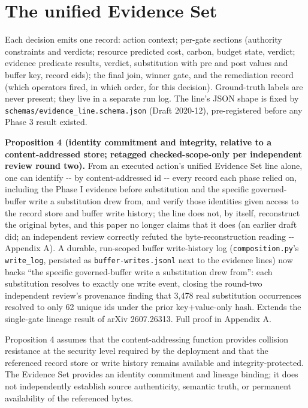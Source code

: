\documentclass[11pt,a4paper]{article}
\theoremstyle{definition}
\begin{document}
\section{The unified Evidence Set}

Each decision emits one record: action context; per-gate sections (authority constraints and verdicts; resource predicted cost, carbon, budget state, verdict; evidence predicate results, verdict, substitution with pre and post values and buffer key, record eids); the final join, winner gate, and the remediation record (which operators fired, in which order, for this decision). Ground-truth labels are never present; they live in a separate run log. The line's JSON shape is fixed by \texttt{schemas/evidence\_line.schema.json} (Draft 2020-12), pre-registered before any Phase 3 result existed.

\noindent\textbf{Proposition 4 (identity commitment and integrity, relative to a content-addressed store; retagged checked-scope-only per independent review round two).} From an executed action's unified Evidence Set line alone, one can identify -{}- by content-addressed id -{}- every record each phase relied on, including the Phase I evidence before substitution and the specific governed-buffer write a substitution drew from, and verify those identities given access to the record store and buffer write history; the line does not, by itself, reconstruct the original bytes, and this paper no longer claims that it does (an earlier draft did; an independent review correctly refuted the byte-reconstruction reading -{}- Appendix A). A durable, run-scoped buffer write-history log (\texttt{composition.py}'s \texttt{write\_log}, persisted as \texttt{buffer-writes.jsonl} next to the evidence lines) now backs ``the specific governed-buffer write a substitution drew from'': each substitution resolves to exactly one write event, closing the round-two independent review's provenance finding that 3,478 real substitution occurrences resolved to only 62 unique ids under the prior key+value-only hash. Extends the single-gate lineage result of arXiv 2607.26313. Full proof in Appendix A.

\noindent Proposition 4 assumes that the content-addressing function provides collision resistance at the security level required by the deployment and that the referenced record store or write history remains available and integrity-protected. The Evidence Set provides an identity commitment and lineage binding; it does not independently establish source authenticity, semantic truth, or permanent availability of the referenced bytes.
\end{document}
